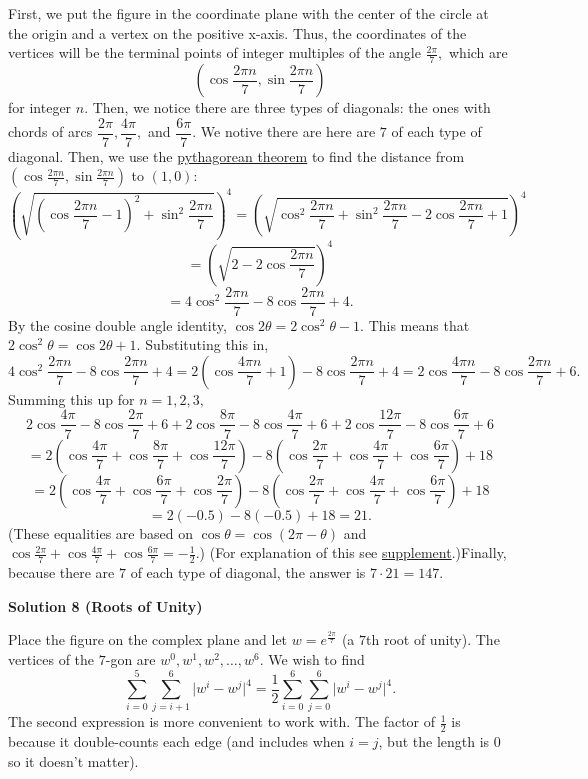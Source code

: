 \begin{enumerate}
First, we put the figure in the coordinate plane with the center of the circle at the origin and a vertex on the positive x-axis. Thus, the coordinates of the vertices will be the terminal points of integer multiples of the angle $\frac{2\pi}{7},$ which are 
 \[\left(\cos\dfrac{2\pi n}{7}, \sin\dfrac{2\pi n}{7}\right)\] for integer $n.$ Then, we notice there are three types of diagonals: the ones with chords of arcs $\dfrac{2\pi}{7}, \dfrac{4\pi}{7},$ and $\dfrac{6\pi}{7}.$ We notive there are here are $7$ of each type of diagonal. Then, we use the \href{https://artofproblemsolving.com/wiki/index.php?title=Pythagorean\_theorem}{pythagorean theorem} to find the distance from $\left(\cos\frac{2\pi n}{7}, \sin\frac{2\pi n}{7}\right)$ to $(1, 0)$:
 \[\left(\sqrt{\left(\cos\frac{2\pi n}{7}-1\right)^2+\sin^2\frac{2\pi n}{7}}\right)^4=\left(\sqrt{\cos^2\frac{2\pi n}{7}+\sin^2\frac{2\pi n}{7}-2\cos\frac{2\pi n}{7}+1}\right)^4\]
 \[=\left(\sqrt{2-2\cos\frac{2\pi n}{7}}\right)^4\]
 \[=4\cos^2\frac{2\pi n}{7}-8\cos\frac{2\pi n}{7}+4.\]By the cosine double angle identity, $\cos{2\theta}=2\cos^2\theta-1.$ This means that $2\cos^2\theta=\cos{2\theta}+1.$ Substituting this in,
 \[4\cos^2\frac{2\pi n}{7}-8\cos\frac{2\pi n}{7}+4=2\left(\cos\frac{4\pi n}{7}+1\right)-8\cos\frac{2\pi n}{7}+4=2\cos\frac{4\pi n}{7}-8\cos\frac{2\pi n}{7}+6.\] Summing this up for $n=1,2,3,$ 
 \[2\cos\frac{4\pi}{7}-8\cos\frac{2\pi}{7}+6+2\cos\frac{8\pi}{7}-8\cos\frac{4\pi}{7}+6+2\cos\frac{12\pi}{7}-8\cos\frac{6\pi}{7}+6\] 
 \[=2\left(\cos\frac{4\pi}{7}+\cos\frac{8\pi}{7}+\cos\frac{12\pi}{7}\right)-8\left(\cos\frac{2\pi}{7}+\cos\frac{4\pi}{7}+\cos\frac{6\pi}{7}\right)+18\]
 \[=2\left(\cos\frac{4\pi}{7}+\cos\frac{6\pi}{7}+\cos\frac{2\pi}{7}\right)-8\left(\cos\frac{2\pi}{7}+\cos\frac{4\pi}{7}+\cos\frac{6\pi}{7}\right)+18\]
 \[=2(-0.5)-8(-0.5)+18=21.\](These equalities are based on $\cos\theta=\cos(2\pi-\theta)$ and $\cos\frac{2\pi}{7}+\cos\frac{4\pi}{7}+\cos\frac{6\pi}{7}=-\frac{1}{2}.$) (For explanation of this see \href{https://artofproblemsolving.com/wiki/index.php/2022\_AMC\_12B\_Problems/Problem\_24\#Supplement\_.28Explanation\_to\_Why\_cos.282.CF.80.2F7.29\_.2B\_cos.284.CF.80.2F7.29\_.2B\_cos.286.CF.80.2F7.29\_.3D\_-1.2F2.29}{supplement}.)Finally, because there are $7$ of each type of diagonal, the answer is $7\cdot 21=\boxed{147}.$




\textbf{Solution 8 (Roots of Unity)}

Place the figure on the complex plane and let $w = e^{\frac{2\pi}{7}}$ (a $7$th root of unity). The vertices of the $7$-gon are $w^0,w^1,w^2,\dots,w^6$. We wish to find
 \[\sum_{i=0}^5\sum_{j=i+1}^6\lvert w^i-w^j\rvert^4 = \frac{1}{2}\sum_{i=0}^6\sum_{j=0}^6\lvert w^i-w^j\rvert^4.\]The second expression is more convenient to work with. The factor of $\frac{1}{2}$ is because it double-counts each edge (and includes when $i=j$, but the length is $0$ so it doesn't matter).


\end{enumerate}
